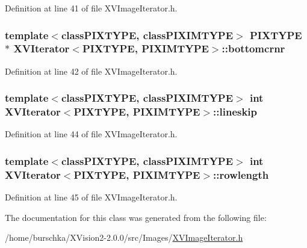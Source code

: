 Definition at line 41 of file XVImage\-Iterator.h.\label{XVIterator_n3}
\hypertarget{class_XVIterator_n3}{
\subsubsection[bottomcrnr]{\setlength{\rightskip}{0pt plus 5cm}template$<$classPIXTYPE, classPIXIMTYPE$>$ PIXTYPE $\ast$ XVIterator$<$PIXTYPE, PIXIMTYPE$>$::bottomcrnr}}




Definition at line 42 of file XVImage\-Iterator.h.\label{XVIterator_n4}
\hypertarget{class_XVIterator_n4}{
\subsubsection[lineskip]{\setlength{\rightskip}{0pt plus 5cm}template$<$classPIXTYPE, classPIXIMTYPE$>$ int XVIterator$<$PIXTYPE, PIXIMTYPE$>$::lineskip}}




Definition at line 44 of file XVImage\-Iterator.h.\label{XVIterator_n5}
\hypertarget{class_XVIterator_n5}{
\subsubsection[rowlength]{\setlength{\rightskip}{0pt plus 5cm}template$<$classPIXTYPE, classPIXIMTYPE$>$ int XVIterator$<$PIXTYPE, PIXIMTYPE$>$::rowlength}}




Definition at line 45 of file XVImage\-Iterator.h.

The documentation for this class was generated from the following file:\begin{CompactItemize}
\item 
/home/burschka/XVision2-2.0.0/src/Images/\hyperlink{XVImageIterator.h-source}{XVImage\-Iterator.h}\end{CompactItemize}
